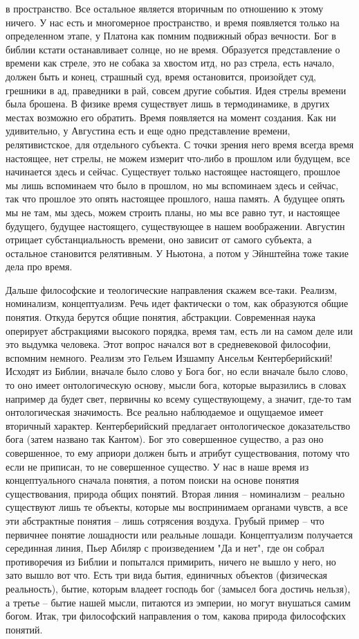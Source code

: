 \documentclass[a4paper, 12pt]{article}
\begin{document}
в пространство. Все остальное является вторичным по отношению к этому 
ничего. У нас есть и многомерное пространство, и время появляется только 
на определенном этапе, у Платона как помним подвижный образ вечности. 
Бог в библии кстати останавливает солнце, но не время. Образуется 
представление о времени как стреле, это не собака за хвостом итд, но раз 
стрела, есть начало, должен быть и конец, страшный суд, время 
остановится, произойдет суд, грешники в ад, праведники в рай, совсем 
другие события. Идея стрелы времени была брошена. В физике время 
существует лишь в термодинамике, в других местах возможно его обратить. 
Время появляется на момент создания. Как ни удивительно, у Августина 
есть и еще одно представление времени, релятивистское, для отдельного 
субъекта. С точки зрения него время всегда время настоящее, нет стрелы, 
не можем измерит что-либо в прошлом или будущем, все начинается здесь 
и сейчас. Существует только настоящее настоящего, прошлое мы лишь 
вспоминаем что было в прошлом, но мы вспоминаем здесь и сейчас, так что 
прошлое это опять настоящее прошлого, наша память. А будущее опять мы не 
там, мы здесь, можем строить планы, но мы все равно тут, и настоящее 
будущего, будущее настоящего, существующее в нашем воображении. Августин 
отрицает субстанциальность времени, оно зависит от самого субъекта, 
а остальное становится релятивным. У Ньютона, а потом у Эйнштейна тоже 
такие дела  про время.

Дальше философские и теологические направления скажем все-таки. Реализм, 
номинализм, концептуализм. Речь идет фактически о том, как образуются 
общие понятия. Откуда берутся общие понятия, абстракции. Современная 
наука оперирует абстракциями высокого порядка, время там, есть ли на 
самом деле или это выдумка человека. Этот вопрос начался вот 
в средневековой философии, вспомним немного. Реализм это Гельем Изшампу 
Ансельм Кентерберийский! Исходят из Библии, вначале было слово у Бога 
бог, но если вначале было слово, то оно имеет онтологическую основу, 
мысли бога, которые выразились в словах например да будет свет, первичны 
ко всему существующему, а значит, где-то там онтологическая значимость. 
Все реально наблюдаемое и ощущаемое имеет вторичный характер. 
Кентерберийский предлагает онтологическое доказательство бога (затем 
названо так Кантом). Бог это совершенное существо, а раз оно 
совершенное, то ему априори должен быть и атрибут существования, потому 
что если не приписан, то не совершенное существо. У нас в наше время из 
концептуального сначала понятия, а потом поиски на основе понятия 
существования, природа общих понятий. Вторая линия -- номинализм -- 
реально существуют лишь те объекты, которые мы воспринимаем органами 
чувств, а все эти абстрактные понятия -- лишь сотрясения воздуха. Грубый 
пример -- что первичнее понятие лошадности или реальные лошади. 
Концептуализм получается серединная линия, Пьер Абиляр с произведением 
"Да и нет", где он собрал противоречия из Библии и попытался примирить, 
ничего не вышло у него, но зато вышло вот что. Есть три вида бытия, 
единичных объектов (физическая реальность), бытие, которым владеет 
господь бог (замысел бога достичь нельзя), а третье -- бытие нашей 
мысли, питаются из эмперии, но могут внушаться самим богом. Итак, три 
философский направления о том, какова природа философских понятий.
\end{document}
